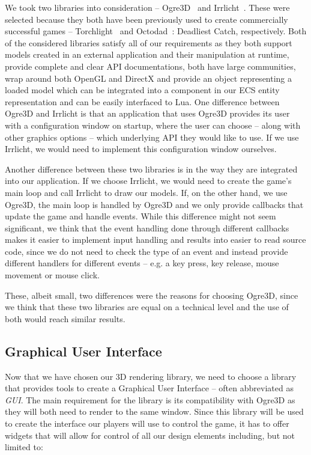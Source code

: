 We took two libraries into consideration -- Ogre3D~\cite{Ogre3D} and Irrlicht~\cite{Irrlicht}. These were selected because they both have
been previously used to create commercially successful games -- Torchlight~\cite{Torchlight} and Octodad~\cite{Octodad}: Deadliest Catch, 
respectively.
Both of the considered libraries satisfy all of our requirements as they both
support models created in an external application and their manipulation at runtime, provide complete and clear API documentations,
both have large communities, wrap around both OpenGL and DirectX and provide an object representing a loaded model which can be
integrated into a component in our ECS entity representation and can be easily interfaced to Lua. One difference between Ogre3D and Irrlicht
is that an application that uses Ogre3D provides its user with a configuration window on startup, where the user can choose -- along with
other graphics options -- which underlying API they would like to use. If we use Irrlicht, we would need to implement this configuration
window ourselves.

Another difference between these two libraries is in the way they are integrated into our application. If we choose Irrlicht, we would need
to create the game's main loop and call Irrlicht to draw our models. If, on the other hand, we use Ogre3D, the main loop is handled by Ogre3D
and we only provide callbacks that update the game and handle events. While this difference might not seem significant, we think that
the event handling done through different callbacks makes it easier to implement input handling and results into easier to read source
code, since we do not need to check the type of an event and instead provide different handlers for different events -- e.g.
a key press, key release, mouse movement or mouse click.

These, albeit small, two differences were the reasons for choosing Ogre3D, since we think that these two libraries are equal
on a technical level and the use of both would reach similar results.

\subsection{Graphical User Interface}

Now that we have chosen our 3D rendering library, we need to choose a library that provides tools to create a Graphical User Interface 
-- often abbreviated as \emph{GUI}. The main requirement for the library is its compatibility with Ogre3D as they will both need to render
to the same window. Since this library will be used to create the interface our players will use to control the game,
it has to offer widgets that will allow for control of all our design elements including, but not limited to:

